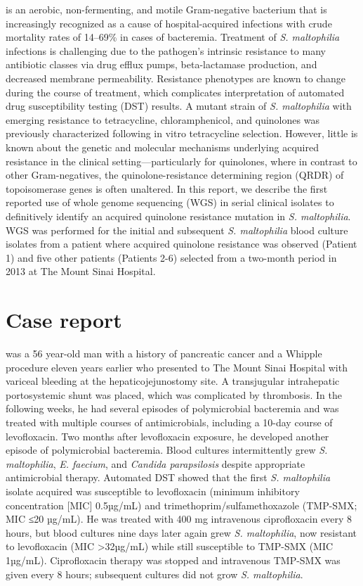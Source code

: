  is an aerobic, non-fermenting, and motile Gram-negative bacterium that is increasingly recognized as a cause of hospital-acquired infections with crude mortality rates of 14–69\% in cases of bacteremia.\autocite{Brooke2012} Treatment of \emph{S. maltophilia} infections is challenging due to the pathogen’s intrinsic resistance to many antibiotic classes via drug efflux pumps, beta-lactamase production, and decreased membrane permeability.\autocite{Brooke2012} Resistance phenotypes are known to change during the course of treatment, which complicates interpretation of automated drug susceptibility testing (DST) results. A mutant strain of \emph{S. maltophilia} with emerging resistance to tetracycline, chloramphenicol, and quinolones was previously characterized following in vitro tetracycline selection. However, little is known about the genetic and molecular mechanisms underlying acquired resistance in the clinical setting—particularly for quinolones, where in contrast to other Gram-negatives, the qui\-no\-lone-\allowbreak re\-sis\-tance determining region (QRDR) of topoisomerase genes is often unaltered.\autocite{Valdezate2005} In this report, we describe the first reported use of whole genome sequencing (WGS) in serial clinical isolates to definitively identify an acquired quinolone resistance mutation in \emph{S. maltophilia}. WGS was performed for the initial and subsequent \emph{S. maltophilia} blood culture isolates from a patient where acquired quinolone resistance was observed (Patient 1) and five other patients (Patients 2-6) selected from a two-month period in 2013 at The Mount Sinai Hospital. 

\section{Case report}

 was a 56 year-old man with a history of pancreatic cancer and a Whipple procedure eleven years earlier who presented to The Mount Sinai Hospital with variceal bleeding at the hepaticojejunostomy site. A transjugular intrahepatic portosystemic shunt was placed, which was complicated by thrombosis. In the following weeks, he had several episodes of polymicrobial bacteremia and was treated with multiple courses of antimicrobials, including a 10-day course of levofloxacin. Two months after levofloxacin exposure, he developed another episode of polymicrobial bacteremia. Blood cultures intermittently grew \emph{S. maltophilia}, \emph{E. faecium}, and \emph{Candida parapsilosis} despite appropriate antimicrobial therapy. Automated DST showed that the first \emph{S. maltophilia} isolate acquired was susceptible to levofloxacin (minimum inhibitory concentration [MIC] 0.5µg/mL) and trimethoprim/sulfamethoxazole (TMP-SMX; MIC ≤20 µg/mL). He was treated with 400 mg intravenous ciprofloxacin every 8 hours, but blood cultures nine days later again grew \emph{S. maltophilia}, now resistant to levofloxacin (MIC >32µg/mL) while still susceptible to TMP-SMX (MIC 1µg/mL). Ciprofloxacin therapy was stopped and intravenous TMP-SMX was given every 8 hours; subsequent cultures did not grow \emph{S. maltophilia}.

